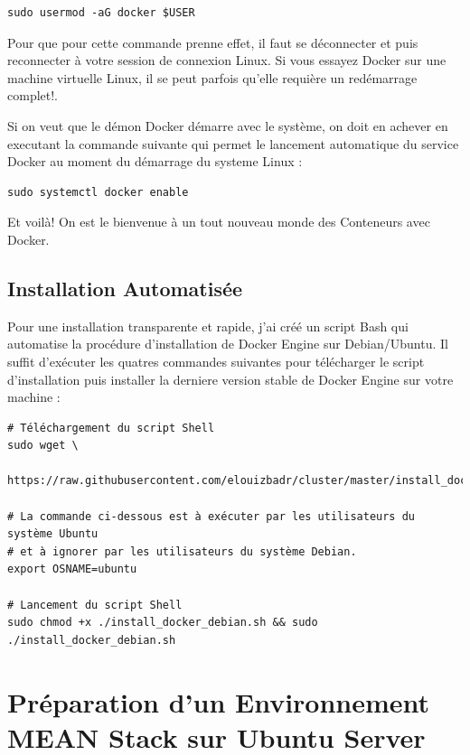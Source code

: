 \documentclass[a4paper,11pt,oneside]{report}
\begin{document}
\begin{appendices}
\begin{verbatim}
sudo usermod -aG docker $USER
\end{verbatim}

Pour que pour cette commande prenne effet, il faut se déconnecter et puis reconnecter à votre session de connexion Linux. Si vous essayez Docker sur une machine virtuelle Linux, il se peut parfois qu'elle requière un redémarrage complet!.
\newline

Si on veut que le démon Docker démarre avec le système, on doit en achever en executant la commande suivante qui permet le lancement automatique du service Docker au moment du démarrage du systeme Linux :

\begin{verbatim}
sudo systemctl docker enable
\end{verbatim}


Et voilà! On est le bienvenue à un tout nouveau monde des Conteneurs avec Docker.

\newpage

\section{Installation Automatisée}

Pour une installation transparente et rapide, j'ai créé un script Bash qui automatise la procédure d'installation de Docker Engine sur Debian/Ubuntu. Il suffit d'exécuter les quatres commandes suivantes pour télécharger le script d'installation puis installer la derniere version stable de Docker Engine sur votre machine :

\begin{verbatim}
# Téléchargement du script Shell
sudo wget \
  https://raw.githubusercontent.com/elouizbadr/cluster/master/install_docker_debian.sh

# La commande ci-dessous est à exécuter par les utilisateurs du système Ubuntu
# et à ignorer par les utilisateurs du système Debian.
export OSNAME=ubuntu 

# Lancement du script Shell
sudo chmod +x ./install_docker_debian.sh && sudo ./install_docker_debian.sh
\end{verbatim}

\chapter{Préparation d'un Environnement MEAN Stack sur Ubuntu Server}


\end{appendices}
\end{document}
